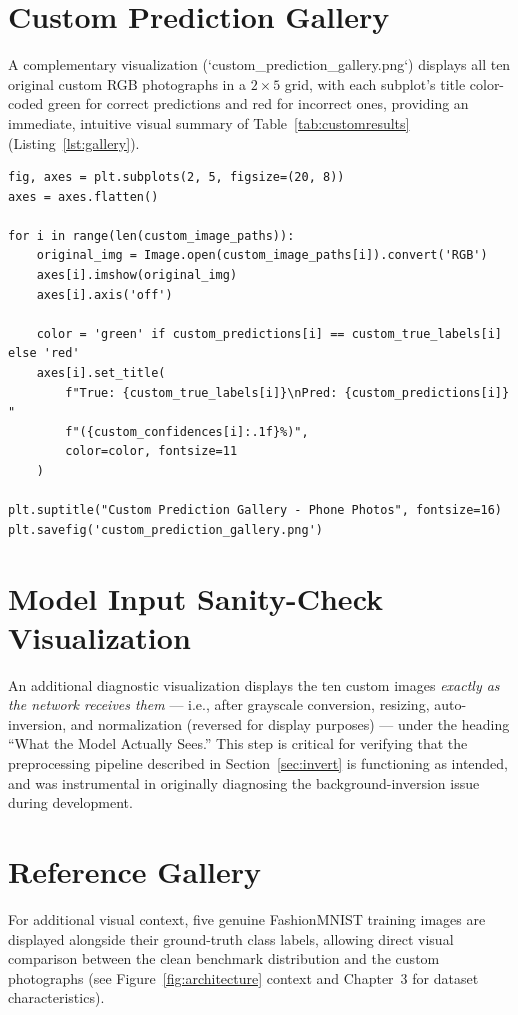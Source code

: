 \documentclass[12pt,a4paper]{report}
\begin{document}
\section{Custom Prediction Gallery}
A complementary visualization (`custom\_prediction\_gallery.png`) displays all ten original custom RGB photographs in a $2\times5$ grid, with each subplot's title color-coded green for correct predictions and red for incorrect ones, providing an immediate, intuitive visual summary of Table~\ref{tab:customresults} (Listing~\ref{lst:gallery}).

\begin{lstlisting}[caption={Color-coded custom prediction gallery}, label={lst:gallery}]
fig, axes = plt.subplots(2, 5, figsize=(20, 8))
axes = axes.flatten()

for i in range(len(custom_image_paths)):
    original_img = Image.open(custom_image_paths[i]).convert('RGB')
    axes[i].imshow(original_img)
    axes[i].axis('off')

    color = 'green' if custom_predictions[i] == custom_true_labels[i] else 'red'
    axes[i].set_title(
        f"True: {custom_true_labels[i]}\nPred: {custom_predictions[i]} "
        f"({custom_confidences[i]:.1f}%)",
        color=color, fontsize=11
    )

plt.suptitle("Custom Prediction Gallery - Phone Photos", fontsize=16)
plt.savefig('custom_prediction_gallery.png')
\end{lstlisting}

\section{Model Input Sanity-Check Visualization}
An additional diagnostic visualization displays the ten custom images \emph{exactly as the network receives them} — i.e., after grayscale conversion, resizing, auto-inversion, and normalization (reversed for display purposes) — under the heading ``What the Model Actually Sees.'' This step is critical for verifying that the preprocessing pipeline described in Section~\ref{sec:invert} is functioning as intended, and was instrumental in originally diagnosing the background-inversion issue during development.

\section{Reference Gallery}
For additional visual context, five genuine FashionMNIST training images are displayed alongside their ground-truth class labels, allowing direct visual comparison between the clean benchmark distribution and the custom photographs (see Figure~\ref{fig:architecture} context and Chapter~3 for dataset characteristics).
\end{document}
